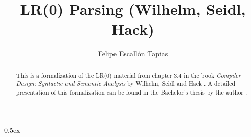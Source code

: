 \documentclass[11pt,a4paper]{article}
\begin{document}
\title{LR(0) Parsing (Wilhelm, Seidl, Hack)}
\author{Felipe Escall\'{o}n Tapias}
\maketitle

\begin{abstract}
This is a formalization of the LR(0) material from chapter 3.4 in the book
\emph{Compiler Design: Syntactic and Semantic Analysis} by Wilhelm, Seidl and Hack \cite{WilhelmSH}.
A detailed presentation of this formalization can be found
in the Bachelor's thesis by the author \cite{Escallon}.
\end{abstract}

\tableofcontents

\parindent 0pt\parskip 0.5ex

\newpage




\end{document}
